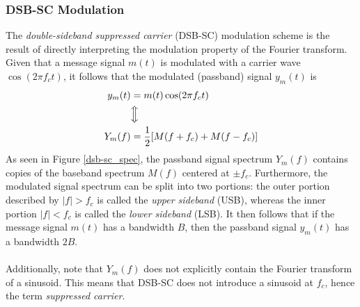 \documentclass{report}
\begin{document}
\subsubsection{DSB-SC Modulation}
The \emph{double-sideband suppressed carrier} (DSB-SC) modulation scheme is the result of directly interpreting the modulation property of the Fourier transform. Given that a message signal $m(t)$ is 
modulated with a carrier wave $\cos(2\pi f_c t)$, it follows that the modulated (passband) signal $y_m(t)$ is
\begin{align}
    y_m(t) &= m(t)\cos(2\pi f_c t) \\ 
    &\Big\Updownarrow \nonumber \\
    Y_m(f) &= \frac{1}{2}[M(f+f_c) + M(f-f_c)]
\end{align}
As seen in Figure \ref{dsb-sc_spec}, the passband signal spectrum $Y_m(f)$ contains copies of the baseband spectrum $M(f)$ centered at $\pm f_c$. Furthermore, the modulated signal spectrum can be split into two portions: 
the outer portion described by $|f|>f_c$ is called the \emph{upper sideband} (USB), whereas the inner portion $|f|<f_c$ is called the \emph{lower sideband} (LSB). It then follows that if the message signal 
$m(t)$ has a bandwidth $B$, then the passband signal $y_m(t)$ has a bandwidth $2B$.
\\ \\
Additionally, note that $Y_m(f)$ does not explicitly contain the Fourier transform of a sinusoid. This means that DSB-SC does not introduce a sinusoid at $f_c$, hence the term \emph{suppressed carrier}.
\end{document}
